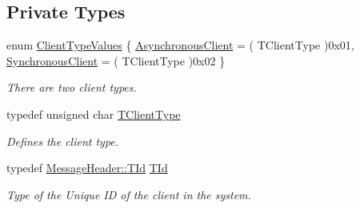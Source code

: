 \subsection*{Private Types}
\begin{DoxyCompactItemize}
\item 
enum \hyperlink{class_client_manager_ac12239be9a30847f677a32910822d40b}{Client\-Type\-Values} \{ \hyperlink{class_client_manager_ac12239be9a30847f677a32910822d40ba5efa5897435cfd442d637beea251c85a}{Asynchronous\-Client} = ( T\-Client\-Type )0x01, 
\hyperlink{class_client_manager_ac12239be9a30847f677a32910822d40bada4fe5ba56979f1deaf93b69d0a8fcae}{Synchronous\-Client} = ( T\-Client\-Type )0x02
 \}
\begin{DoxyCompactList}\small\item\em There are two client types. \end{DoxyCompactList}\item 
typedef unsigned char \hyperlink{class_client_manager_a223aecacabe855f08e4675b12403dfa4}{T\-Client\-Type}
\begin{DoxyCompactList}\small\item\em Defines the client type. \end{DoxyCompactList}\item 
typedef \hyperlink{class_terra_swarm_1_1_message_header_ab55de822fadad758edcd8f36bd07676e}{Message\-Header\-::\-T\-Id} \hyperlink{class_client_manager_a531e5e7eb779e8ce3c47b8eabd8e9b17}{T\-Id}
\begin{DoxyCompactList}\small\item\em Type of the Unique I\-D of the client in the system. \end{DoxyCompactList}\end{DoxyCompactItemize}
